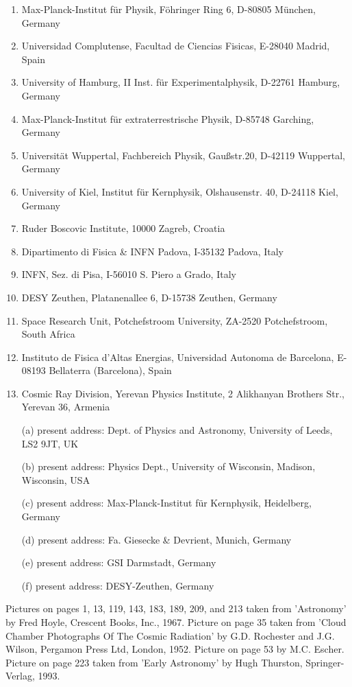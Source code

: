 {\footnotesize
\begin{enumerate}
\item
Max-Planck-Institut f\"ur Physik, 
F\"ohringer Ring 6, D-80805 M\"unchen, Germany
\item     
    Universidad Complutense, 
Facultad de Ciencias Fisicas, E-28040 Madrid, Spain 
\item     
    University of Hamburg, 
II Inst. f\"ur Experimentalphysik, D-22761 Hamburg, Germany
\item     
    Max-Planck-Institut 
f\"ur extraterrestrische Physik, D-85748 Garching, Germany
\item     
    Universit\"at Wuppertal, 
Fachbereich Physik, Gau\ss str.20, D-42119 Wuppertal, Germany
\item     
    University of Kiel, Institut 
f\"ur Kernphysik, Olshausenstr. 40, D-24118 Kiel, Germany
\item     
   Ruder Boscovic Institute, 10000 Zagreb, Croatia
\item     
    Dipartimento di Fisica \& INFN Padova, I-35132 Padova, Italy
\item     
   INFN, Sez. di Pisa, I-56010 S. Piero a Grado, Italy
\item     
    DESY Zeuthen, Platanenallee 6, D-15738 Zeuthen, Germany
\item     
    Space Research Unit, Potchefstroom 
University, ZA-2520 Potchefstroom, South Africa
\item
 Instituto de Fisica d'Altas Energias, Universidad Autonoma de
Barcelona, E-08193 Bellaterra (Barcelona), Spain
\item
 Cosmic Ray Division, Yerevan Physics Institute, 2 Alikhanyan Brothers
Str., Yerevan 36, Armenia
\end{enumerate}
\begin{itemize}
\item[(a)]
 present address: Dept. of Physics and Astronomy, University of Leeds,
LS2 9JT, UK
\item[(b)]
 present address: Physics Dept., University of Wisconsin, Madison,
Wisconsin, USA
\item[(c)]
 present address: Max-Planck-Institut f\"ur Kernphysik, Heidelberg,
Germany
\item[(d)]
 present address: Fa. Giesecke \& Devrient, Munich, Germany
\item[(e)]
 present address: GSI Darmstadt, Germany
\item[(f)]
 present address: DESY-Zeuthen, Germany
\end{itemize}
}
\vfill
\noindent
Pictures on pages 1, 13, 119, 143, 183, 189, 209, and 213 taken from 'Astronomy' by Fred Hoyle, Crescent
Books, Inc., 1967. \newline
Picture on page 35 taken from 'Cloud Chamber Photographs Of The Cosmic
Radiation' by G.D. Rochester and J.G. Wilson, Pergamon Press Ltd,
London, 1952. \newline
Picture on page 53 by M.C. Escher. \newline
Picture on page 223 taken from 'Early Astronomy' by Hugh Thurston, Springer-Verlag, 1993. \newline

